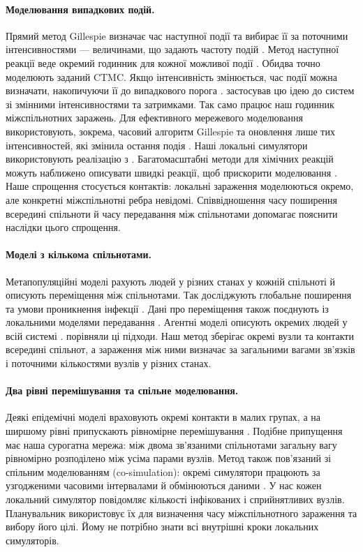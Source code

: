 ﻿\documentclass[11pt,a4paper]{article}
\begin{document}
\paragraph{Моделювання випадкових подій.}
Прямий метод Gillespie визначає час наступної події та вибирає її за поточними інтенсивностями --- величинами, що задають частоту подій \citep{gillespie1977exact}. Метод наступної реакції веде окремий годинник для кожної можливої події \citep{gibson2000}. Обидва точно моделюють заданий CTMC. Якщо інтенсивність змінюється, час події можна визначати, накопичуючи її до випадкового порога \citep{ethier1986}. \citet{anderson2007} застосував цю ідею до систем зі змінними інтенсивностями та затримками. Так само працює наш годинник міжспільнотних заражень. Для ефективного мережевого моделювання використовують, зокрема, часовий алгоритм Gillespie та оновлення лише тих інтенсивностей, які змінила остання подія \citep{vestergaard2015,kuryliak2025simulating}. Наші локальні симулятори використовують реалізацію з \citet{kuryliak2025simulating}.
Багатомасштабні методи для хімічних реакцій можуть наближено описувати швидкі реакції, щоб прискорити моделювання \citep{haseltine2002,cao2005slow}. Наше спрощення стосується контактів: локальні зараження моделюються окремо, але конкретні міжспільнотні ребра невідомі. Співвідношення часу поширення всередині спільноти й часу передавання між спільнотами допомагає пояснити наслідки цього спрощення.
\paragraph{Моделі з кількома спільнотами.}
Метапопуляційні моделі рахують людей у різних станах у кожній спільноті й описують переміщення між спільнотами. Так досліджують глобальне поширення та умови проникнення інфекції \citep{colizza2007reaction,colizza2008,balcan2009,balcan2010modeling}. Дані про переміщення також поєднують із локальними моделями передавання \citep{chang2021}. Агентні моделі описують окремих людей у всій системі \citep{eubank2004,kerr2021}. \citet{ajelli2010} порівняли ці підходи. Наш метод зберігає окремі вузли та контакти всередині спільнот, а зараження між ними визначає за загальними вагами зв'язків і поточними кількостями вузлів у різних станах.
\paragraph{Два рівні перемішування та спільне моделювання.}
Деякі епідемічні моделі враховують окремі контакти в малих групах, а на ширшому рівні припускають рівномірне перемішування \citep{ball1997}. Подібне припущення має наша сурогатна мережа: між двома зв'язаними спільнотами загальну вагу рівномірно розподілено між усіма парами вузлів.
Метод також пов'язаний зі спільним моделюванням (co-simulation): окремі симулятори працюють за узгодженими часовими інтервалами й обмінюються даними \citep{gomes2018cosim}. У нас кожен локальний симулятор повідомляє кількості інфікованих і сприйнятливих вузлів. Планувальник використовує їх для визначення часу міжспільнотного зараження та вибору його цілі. Йому не потрібно знати всі внутрішні кроки локальних симуляторів.
\clearpage
\end{document}
